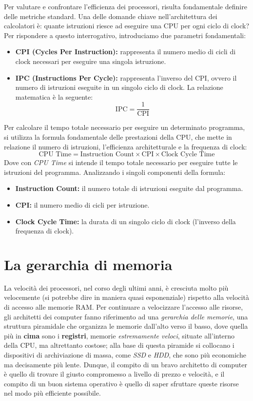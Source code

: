 \documentclass[12pt]{report}
\begin{document}
	Per valutare e confrontare l'efficienza dei processori, risulta fondamentale definire delle metriche standard. Una delle domande chiave nell'architettura dei calcolatori è: quante istruzioni riesce ad eseguire una CPU per ogni ciclo di clock? Per rispondere a questo interrogativo, introduciamo due parametri fondamentali:
	
	\begin{itemize}
		\item \textbf{CPI (Cycles Per Instruction):} rappresenta il numero medio di cicli di clock necessari per eseguire una singola istruzione.
		\item \textbf{IPC (Instructions Per Cycle):} rappresenta l'inverso del CPI, ovvero il numero di istruzioni eseguite in un singolo ciclo di clock. La relazione matematica è la seguente:
		\[
		\text{IPC} = \frac{1}{\text{CPI}}
		\]
	\end{itemize}
	
	Per calcolare il tempo totale necessario per eseguire un determinato programma, si utilizza la formula fondamentale delle prestazioni della CPU, che mette in relazione il numero di istruzioni, l'efficienza architetturale e la frequenza di clock:
	\[
	\text{CPU Time} = \text{Instruction Count} \times \text{CPI} \times \text{Clock Cycle Time}
	\]
	Dove con \textit{CPU Time} si intende il tempo totale necessario per eseguire tutte le istruzioni del programma. Analizzando i singoli componenti della formula:
	\begin{itemize}
		\item \textbf{Instruction Count:} il numero totale di istruzioni eseguite dal programma.
		\item \textbf{CPI:} il numero medio di cicli per istruzione.
		\item \textbf{Clock Cycle Time:} la durata di un singolo ciclo di clock (l'inverso della frequenza di clock).
	\end{itemize}
	
	\newpage
	\section{La gerarchia di memoria}
	La velocità dei processori, nel corso degli ultimi anni, è cresciuta molto più velocemente (si potrebbe dire in maniera quasi esponenziale) rispetto alla velocità di accesso alle memorie RAM. 
	Per continuare a velocizzare l'accesso alle risorse, gli architetti dei computer fanno riferimento ad una \textit{gerarchia delle memorie}, una struttura piramidale che organizza le memorie dall'alto verso il basso, dove quella più in \textbf{cima} sono i \textbf{registri}, memorie \textit{estremamente veloci}, situate all'interno della CPU, ma altrettanto costose; alla base di questa piramide si collocano i dispositivi di archiviazione di massa, come \textit{SSD} e \textit{HDD}, che sono più economiche ma decisamente più lente.
	Dunque, il compito di un bravo architetto di computer è quello di trovare il giusto compromesso a livello di prezzo e velocità, e il compito di un buon sistema operativo è quello di saper sfruttare queste risorse nel modo più efficiente possibile.
	
\end{document}
